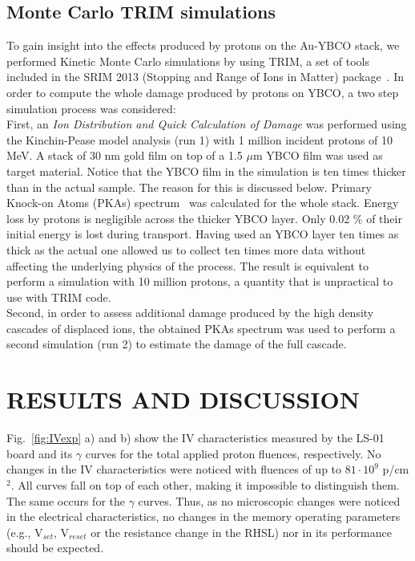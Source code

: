 \documentclass[square,aip,preprint,showkeys,superscriptaddress]{revtex4}
\begin{document}
\subsection{Monte Carlo TRIM simulations}
To gain insight into the effects produced by protons on the Au-YBCO stack, we performed  Kinetic Monte Carlo simulations by using TRIM, a set of tools included in the SRIM 2013 (Stopping and Range of Ions in Matter) package~\cite{Ziegler10,SRIM}. In order to compute the whole damage produced by protons on YBCO, a two step simulation process was considered:\\
First, an \textit{Ion Distribution and Quick Calculation of Damage} was performed using the Kinchin-Pease model analysis (run 1) with 1 million incident protons of 10 MeV. A stack of 30 nm gold film on top of a 1.5 $\mu$m YBCO film was used as target material. Notice that the YBCO film in the simulation is ten times thicker than in the actual sample. The reason for this is discussed below. Primary Knock-on Atoms (PKAs) spectrum~\cite{Marwick75,Gilbert15} was calculated for the whole stack. Energy loss by protons is negligible across the thicker YBCO layer. Only 0.02 \% of their initial energy is lost during transport. Having used an YBCO layer ten times as thick as the actual one allowed us to collect ten times more data without affecting the underlying physics of the process. The result is equivalent to perform a simulation with 10 million protons, a quantity that is unpractical to use with TRIM code. \\
Second, in order to assess additional damage produced by the high density cascades of displaced ions, the obtained PKAs spectrum was used to perform a second simulation (run 2) to estimate the damage of the full cascade.



\section{RESULTS AND DISCUSSION}

Fig.~\ref{fig:IVexp} a) and b) show the IV characteristics measured by the LS-01 board and its $\gamma$ curves for the total applied proton fluences, respectively. No changes in the IV characteristics were noticed with fluences of up to $81 \cdot 10^{9}$ p/cm$^{2}$. All curves fall on top of each other, making it impossible to distinguish them. The same occurs for the $\gamma$ curves. Thus, as no microscopic changes were noticed in the electrical characteristics, no changes in the memory operating parameters (e.g., V$_{set}$, V$_{reset}$ or the resistance change in the RHSL) nor in its performance should be expected.
\end{document}
